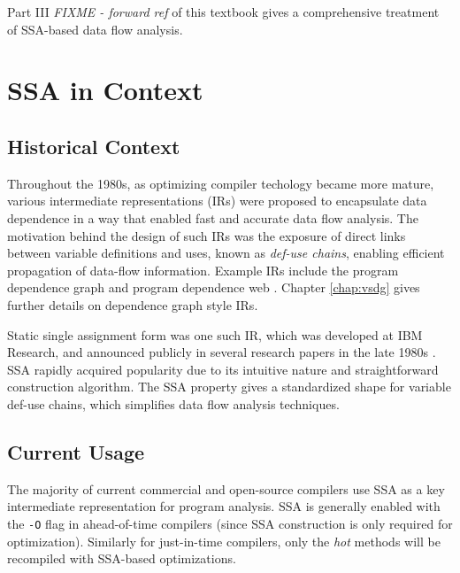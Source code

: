 Part III
\emph{FIXME - forward ref}
of this textbook gives a comprehensive treatment of 
SSA-based data flow analysis.



\section{SSA in Context}




\subsection{Historical Context}

Throughout the 1980s, as optimizing compiler
techology became more mature, various intermediate
representations (IRs) were proposed to encapsulate data
dependence in a way that enabled fast and accurate
data flow analysis.
The motivation behind the design of
such IRs was the exposure of direct links between variable
definitions and uses, known as \textit{def-use chains},
enabling efficient propagation of data-flow information.
Example IRs include the program dependence graph \cite{ferrante87program}
and program dependence web \cite{ottenstein90program}.
Chapter \ref{chap:vsdg} gives further details on dependence graph
style IRs.


Static single assignment form was one such IR, 
which was developed at IBM Research, and announced publicly
in several research papers in the late 1980s
\cite{rosen88global,alpern88detecting,cytron89efficient}.
SSA rapidly acquired popularity due to its 
intuitive nature and straightforward
construction algorithm.
The SSA property gives a 
standardized shape for variable def-use chains,
which simplifies data flow analysis techniques.

\subsection{Current Usage}

The majority of current commercial and open-source compilers
use SSA as a key intermediate representation for
program analysis.
SSA is generally enabled with the \texttt{-O}
flag in ahead-of-time compilers (since SSA construction
is only required for optimization).
Similarly for just-in-time compilers, only the \textit{hot} 
methods will be recompiled with SSA-based optimizations.

